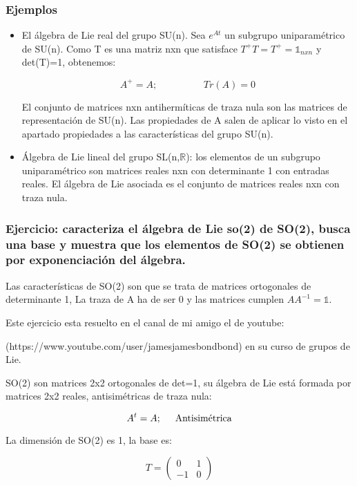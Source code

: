 \subsubsection{Ejemplos}

\begin{itemize}
 \item El álgebra de Lie real del grupo SU(n). Sea $e^{At}$ un subgrupo uniparamétrico de SU(n). Como T es una matriz nxn que satisface $T^+T=T^+=\mathds{1}_{nxn}$ y det(T)=1, obtenemos:

 $$A^+=A; \hspace{2cm} Tr(A)=0$$

 El conjunto de matrices nxn antihermíticas de traza nula son las matrices de representación de SU(n). Las propiedades de A salen de aplicar lo visto en el apartado propiedades a las características del grupo SU(n).

 \item Álgebra de Lie lineal del grupo SL(n,$\mathds{R}$): los elementos de un subgrupo uniparamétrico son matrices reales nxn con determinante 1 con entradas reales. El álgebra de Lie asociada es el conjunto de matrices reales nxn con traza nula.
\end{itemize}

\subsubsection{Ejercicio: caracteriza el álgebra de Lie so(2) de SO(2), busca una base y muestra que los elementos de SO(2) se obtienen por exponenciación del álgebra.}


Las características de SO(2) son que se trata de matrices ortogonales de determinante 1, La traza de A ha de ser 0 y las matrices cumplen $AA^{-1}=\mathds{1}$.

Este ejercicio esta resuelto en el canal de mi amigo el de youtube:

(https://www.youtube.com/user/jamesjamesbondbond) en su curso de grupos de Lie.

\smallskip
SO(2) son matrices 2x2 ortogonales de det=1, su álgebra de Lie está formada por matrices 2x2 reales, antisimétricas de traza nula:

$$A^t=A; \hspace{0.5cm} \text{Antisimétrica}$$

La dimensión de SO(2) es 1, la base es:

$$T=\left ( \begin{array}{cc}
 0 &  1\\
 -1 & 0
\end{array}\right)$$

